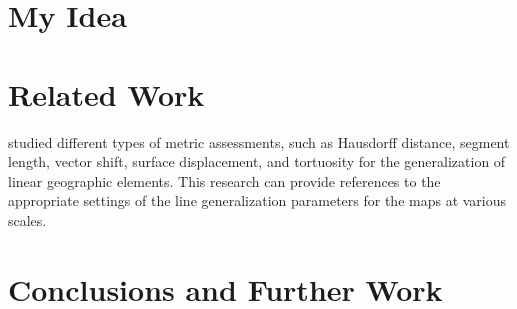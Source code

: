 \documentclass[a4paper]{article}
\begin{document}
\section{My Idea}
\label{sec:my_idea}

\section{Related Work}
\label{sec:related_work}

\cite{stanislawski2012automated} studied different types of metric assessments,
such as Hausdorff distance, segment length, vector shift, surface displacement,
and tortuosity for the generalization of linear geographic elements. This
research can provide references to the appropriate settings of the line
generalization parameters for the maps at various scales.

\section{Conclusions and Further Work}
\label{sec:conclusions_and_further_work}

\printbibliography
\end{document}
